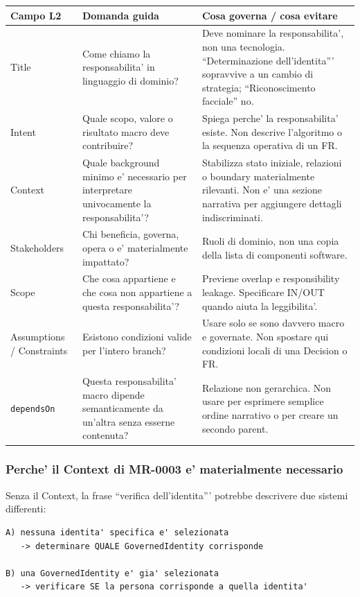 \documentclass[11pt,a4paper]{article}
\begin{document}
\begin{longtable}{L{34mm}L{50mm}L{58mm}}
\toprule
\textbf{Campo L2} & \textbf{Domanda guida} & \textbf{Cosa governa / cosa evitare} \\
\midrule\endhead
Title & Come chiamo la responsabilita' in linguaggio di dominio? & Deve nominare la responsabilita', non una tecnologia. ``Determinazione dell'identita''' sopravvive a un cambio di strategia; ``Riconoscimento facciale'' no. \\
Intent & Quale scopo, valore o risultato macro deve contribuire? & Spiega perche' la responsabilita' esiste. Non descrive l'algoritmo o la sequenza operativa di un FR. \\
Context & Quale background minimo e' necessario per interpretare univocamente la responsabilita'? & Stabilizza stato iniziale, relazioni o boundary materialmente rilevanti. Non e' una sezione narrativa per aggiungere dettagli indiscriminati. \\
Stakeholders & Chi beneficia, governa, opera o e' materialmente impattato? & Ruoli di dominio, non una copia della lista di componenti software. \\
Scope & Che cosa appartiene e che cosa non appartiene a questa responsabilita'? & Previene overlap e responsibility leakage. Specificare IN/OUT quando aiuta la leggibilita'. \\
Assumptions / Constraints & Esistono condizioni valide per l'intero branch? & Usare solo se sono davvero macro e governate. Non spostare qui condizioni locali di una Decision o FR. \\
\texttt{dependsOn} & Questa responsabilita' macro dipende semanticamente da un'altra senza esserne contenuta? & Relazione non gerarchica. Non usare per esprimere semplice ordine narrativo o per creare un secondo parent. \\
\bottomrule
\end{longtable}

\subsubsection{Perche' il Context di MR-0003 e' materialmente necessario}

Senza il Context, la frase ``verifica dell'identita''' potrebbe descrivere due sistemi differenti:

\begin{lstlisting}
A) nessuna identita' specifica e' selezionata
   -> determinare QUALE GovernedIdentity corrisponde

B) una GovernedIdentity e' gia' selezionata
   -> verificare SE la persona corrisponde a quella identita'
\end{lstlisting}
\end{document}

